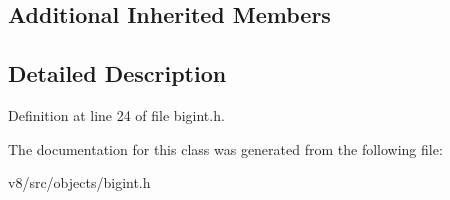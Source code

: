 \subsection*{Additional Inherited Members}


\subsection{Detailed Description}


Definition at line 24 of file bigint.\+h.



The documentation for this class was generated from the following file\+:\begin{DoxyCompactItemize}
\item 
v8/src/objects/bigint.\+h\end{DoxyCompactItemize}
